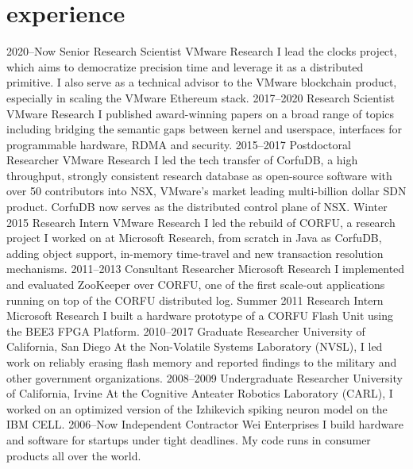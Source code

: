 \section{experience}

\begin{entrylist}
\entry
{2020--Now}
{Senior Research Scientist}
{VMware Research}
{\small I lead the clocks project, which aims to democratize precision time and leverage it as a distributed primitive.
I also serve as a technical advisor to the VMware blockchain product, especially in scaling the VMware Ethereum stack.}
\entry
{2017--2020}
{Research Scientist}
{VMware Research}
{\small I published award-winning papers on a broad range of topics including
 bridging the semantic gaps between kernel and userspace, interfaces for programmable hardware, 
 RDMA and security. }
\entry
{2015--2017}
{Postdoctoral Researcher}
{VMware Research}
{\small I led the tech transfer of CorfuDB, a high throughput, strongly consistent research database 
as open-source software with over 50 contributors into NSX, VMware's market leading multi-billion dollar 
SDN product. CorfuDB now serves as the distributed control plane of NSX.}
\entry
{Winter 2015}
{Research Intern}
{VMware Research}
{\small I led the rebuild of CORFU, a research project I worked on at Microsoft Research, from scratch in Java as CorfuDB, adding object support, in-memory time-travel and new transaction resolution mechanisms.}
\entry
{2011--2013}
{Consultant Researcher}
{Microsoft Research}
{\small I implemented and evaluated ZooKeeper over CORFU, one of the first scale-out applications running on top of the CORFU distributed log.}
\entry
{Summer 2011}
{Research Intern}
{Microsoft Research}
{\small I built a hardware prototype of a CORFU Flash Unit using the BEE3 FPGA Platform.}
\entry
{2010--2017}
{Graduate Researcher}
{University of California, San Diego}
{\small At the Non-Volatile Systems Laboratory (NVSL), I led work on reliably erasing flash memory and reported findings to the military and other government organizations.}
\entry
{2008--2009}
{Undergraduate Researcher}
{University of California, Irvine}
{\small At the Cognitive Anteater Robotics Laboratory (CARL), I worked on an optimized version of the Izhikevich spiking neuron model on the IBM CELL.}
\entry
{2006--Now}
{Independent Contractor}
{Wei Enterprises}
{\small I build hardware and software for startups under tight deadlines. My code runs in consumer products all over the world.}
\end{entrylist}